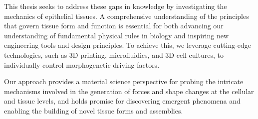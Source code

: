 This thesis seeks to address these gaps in knowledge by investigating the mechanics of epithelial tissues. A comprehensive understanding of the principles that govern tissue form and function is essential for both advancing our understanding of fundamental physical rules in biology and inspiring new engineering tools and design principles. To achieve this, we leverage cutting-edge technologies, such as 3D printing, microfluidics, and 3D cell cultures, to individually control morphogenetic driving factors. 

Our approach provides a material science perspective for probing the intricate mechanisms involved in the generation of forces and shape changes at the cellular and tissue levels, and holds promise for discovering emergent phenomena and enabling the building of novel tissue forms and assemblies.  
